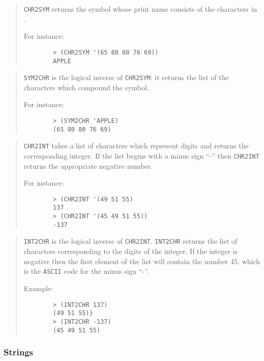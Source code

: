 \begin{quote}
	{\tt CHR2SYM} returns the symbol whose print name consists of the characters
	in \chrlist.

	For instance:
	\begin{verbatim}
		> (CHR2SYM '(65 80 80 76 69))
		APPLE
	\end{verbatim}
\end{quote}

\begin{quote}
	{\tt SYM2CHR} is the logical inverse of {\tt CHR2SYM}: it returns the list
	of the characters which compound the symbol.

	For instance:
	\begin{verbatim}
		> (SYM2CHR 'APPLE)
		(65 80 80 76 69)
	\end{verbatim}
\end{quote}

\begin{quote}
	{\tt CHR2INT} takes a list of characters which represent digits and returns
	the corresponding integer.
	If the list begins with a minus sign ``-'' then {\tt CHR2INT} returns the
	appropriate negative number.

	For instance:
	\begin{verbatim}
		> (CHR2INT '(49 51 55)
		137
		> (CHR2INT '(45 49 51 55))
		-137
	\end{verbatim}
\end{quote}

\begin{quote}
	{\tt INT2CHR} is the logical inverse of {\tt CHR2INT}.
	{\tt INT2CHR} returns the list of characters corresponding to the digits of
	the integer.
	If the integer is negative then the first element of the list will contain
	the number $45$, which is the {\tt ASCII} code for the minus sign ``-''.

	Example:
	\begin{verbatim}
		> (INT2CHR 137)
		(49 51 55)}
		> (INT2CHR -137)
		(45 49 51 55)
	\end{verbatim}
\end{quote}


\subsubsection{Strings}

